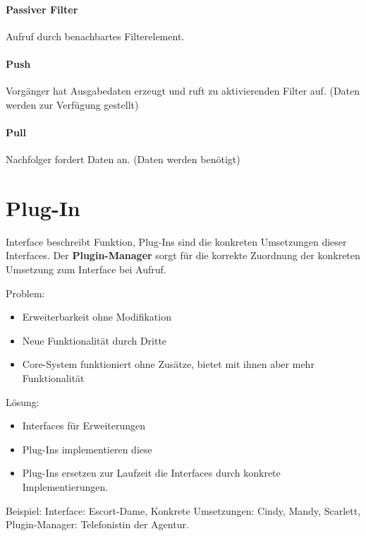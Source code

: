 \paragraph{Passiver Filter}\label{passiver-filter}

Aufruf durch benachbartes Filterelement.

\paragraph{Push}\label{push}

Vorgänger hat Ausgabedaten erzeugt und ruft zu aktivierenden Filter auf.
(Daten werden zur Verfügung gestellt)

\paragraph{Pull}\label{pull}

Nachfolger fordert Daten an. (Daten werden benötigt)

\section{Plug-In}\label{plug-in}

Interface beschreibt Funktion, Plug-Ins sind die konkreten Umsetzungen
dieser Interfaces. Der \textbf{Plugin-Manager} sorgt für die korrekte Zuordnung
der konkreten Umsetzung zum Interface bei Aufruf.

Problem:

\begin{itemize}
\itemsep1pt\parskip0pt
\item
  Erweiterbarkeit ohne Modifikation
\item
  Neue Funktionalität durch Dritte
\item
  Core-System funktioniert ohne Zusätze, bietet mit ihnen aber mehr
  Funktionalität
\end{itemize}

Lösung:

\begin{itemize}
\itemsep1pt\parskip0pt
\item
  Interfaces für Erweiterungen
\item
  Plug-Ins implementieren diese
\item
  Plug-Ins ersetzen zur Laufzeit die Interfaces durch konkrete
  Implementierungen.
\end{itemize}

Beispiel: Interface: Escort-Dame, Konkrete Umsetzungen: Cindy, Mandy,
Scarlett, Plugin-Manager: Telefonistin der Agentur.


